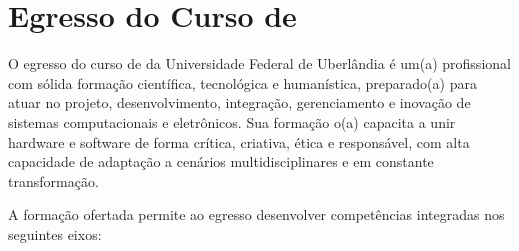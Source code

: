 \section{Egresso do Curso de \ppccurso}

O egresso do curso de \ppccurso da Universidade Federal de Uberlândia é um(a) profissional com sólida formação científica, tecnológica e humanística, preparado(a) para atuar no projeto, desenvolvimento, integração, gerenciamento e inovação de sistemas computacionais e eletrônicos. Sua formação o(a) capacita a unir hardware e software de forma crítica, criativa, ética e responsável, com alta capacidade de adaptação a cenários multidisciplinares e em constante transformação.

A formação ofertada permite ao egresso desenvolver competências integradas nos seguintes eixos:

